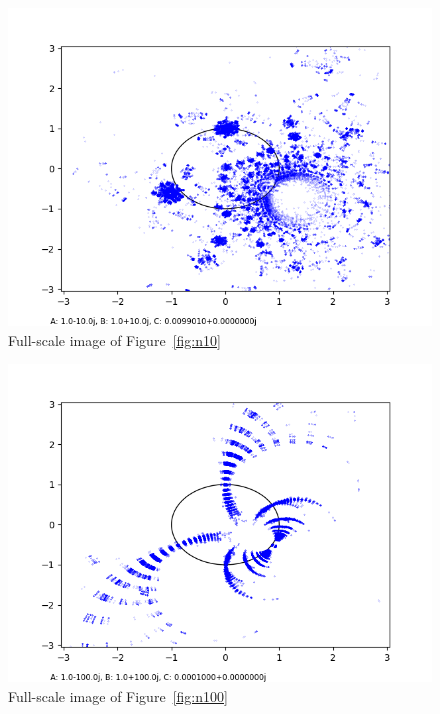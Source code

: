 \documentclass[12pt,a4paper,reqno,parskip=full]{amsart}
\numberwithin{equation}{section}
\theoremstyle{plain}
\theoremstyle{definition}
\begin{document}
\begin{figure}[H]
    \centering
    \includegraphics[width=\textwidth]{images/nn/a-10 b10 h30 d0.01.png}
    \caption{Full-scale image of Figure~\ref{fig:n10}}
\end{figure}

\begin{figure}[H]
    \centering
    \includegraphics[width=\textwidth]{images/nn/a-100 b100 h40 d0.025.png}
    \caption{Full-scale image of Figure~\ref{fig:n100}}
\end{figure}
\end{document}
